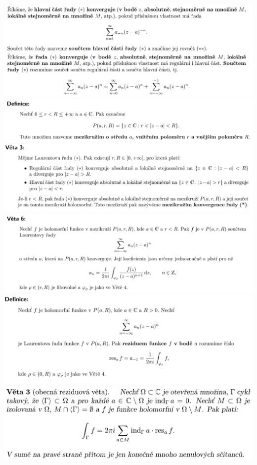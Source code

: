 \documentclass[12pt,a4paper]{article}
\begin{document}
\begin{center}
		\includegraphics[width=\textwidth]{img/5komp/2020-06-21 10 02 43.png}\vspace{0.3cm}
		\includegraphics[width=\textwidth]{img/5komp/2020-06-21 10 02 54.png}\vspace{0.3cm}
		\includegraphics[width=\textwidth]{img/5komp/2020-06-21 10 03 04.png}\vspace{0.3cm}
		\includegraphics[width=\textwidth]{img/5komp/2020-06-21 10 03 28.png}\vspace{0.3cm}
		\includegraphics[width=\textwidth]{img/5komp/2020-06-21 10 03 51.png}\vspace{0.3cm}
		\includegraphics[width=\textwidth]{img/5komp/2020-06-21 10 10 15.png}\vspace{0.3cm}
	\end{center}
\end{document}
